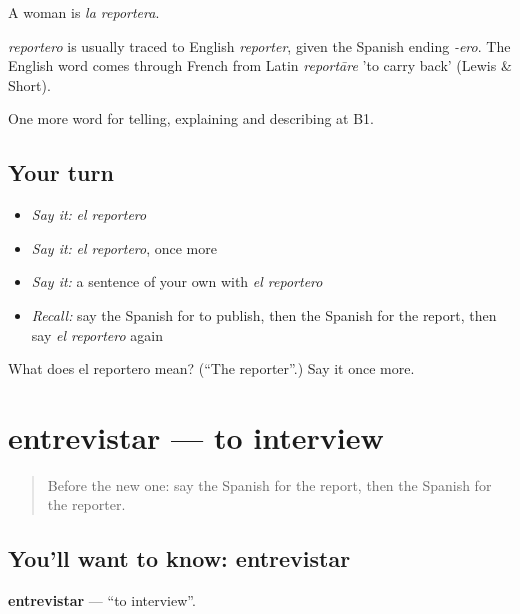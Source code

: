 A woman is \emph{la reportera}.

\begin{cousinweb}
\emph{reportero} is usually traced to English \emph{reporter}, given the Spanish ending \emph{-ero}. The English word comes through French from Latin \emph{reportāre} 'to carry back' (Lewis \& Short).
\end{cousinweb}

\begin{grammarlens}[title={What you've built}]
One more word for telling, explaining and describing at B1.
\end{grammarlens}

\subsection*{Your turn}
\begin{itemize}
\raggedright
  \item \emph{Say it:} \emph{el reportero}
  \item \emph{Say it:} \emph{el reportero}, once more
  \item \emph{Say it:} a sentence of your own with \emph{el reportero}
  \item \emph{Recall:} say the Spanish for to publish, then the Spanish for the report, then say \emph{el reportero} again
\end{itemize}

\begin{tcolorbox}[breakable,colback=teal!4,colframe=teal!35!black,title={Before you move on}]
What does el reportero mean? (\textquotedblleft{}The reporter\textquotedblright{}.) Say it once more.
\end{tcolorbox}
\section[entrevistar]{entrevistar — to interview}

\label{lesson:ES-C514-entrevistar}



\begin{quote}
Before the new one: say the Spanish for the report, then the Spanish for the reporter.
\end{quote}

\subsection*{You'll want to know: entrevistar}
\textbf{entrevistar} — \textquotedblleft{}to interview\textquotedblright{}.

